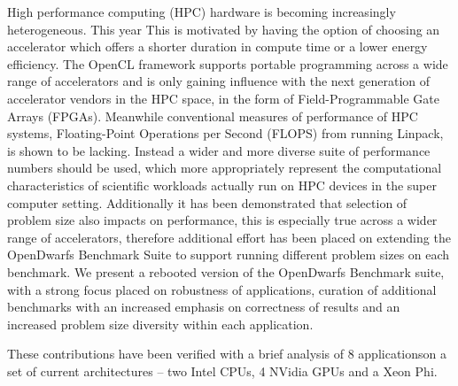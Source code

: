 \documentclass[../document.tex]{subfiles}
\begin{document}
High performance computing (HPC) hardware is becoming increasingly heterogeneous.
This year 
This is motivated by having the option of choosing an accelerator which offers a shorter duration in compute time or a lower energy efficiency.
The OpenCL framework supports portable programming across a wide range of accelerators and is only gaining influence with the next generation of accelerator vendors in the HPC space, in the form of Field-Programmable Gate Arrays (FPGAs).
Meanwhile conventional measures of performance of HPC systems, Floating-Point Operations per Second (FLOPS) from running Linpack, is shown to be lacking.
Instead a wider and more diverse suite of performance numbers should be used, which more appropriately represent the computational characteristics of scientific workloads actually run on HPC devices in the super computer setting.
Additionally it has been demonstrated that selection of problem size also impacts on performance, this is especially true across a wider range of accelerators, therefore additional effort has been placed on extending the OpenDwarfs Benchmark Suite to support running different problem sizes on each benchmark.
We present a rebooted version of the OpenDwarfs Benchmark suite, with a strong focus placed on robustness of applications, curation of additional benchmarks with an increased emphasis on correctness of results and an increased problem size diversity within each application.

These contributions have been verified with a brief analysis of 8 applicationson a set of current architectures -- two Intel CPUs, 4 NVidia GPUs and a Xeon Phi.



\end{document}
